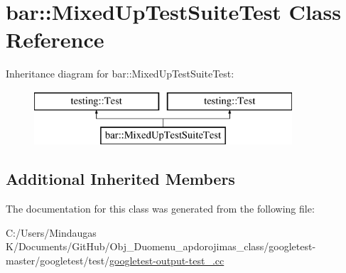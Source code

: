 \hypertarget{classbar_1_1_mixed_up_test_suite_test}{}\section{bar\+::Mixed\+Up\+Test\+Suite\+Test Class Reference}
\label{classbar_1_1_mixed_up_test_suite_test}
Inheritance diagram for bar\+::Mixed\+Up\+Test\+Suite\+Test\+:\begin{figure}[H]
\begin{center}
\leavevmode
\includegraphics[height=2.000000cm]{df/daf/classbar_1_1_mixed_up_test_suite_test}
\end{center}
\end{figure}
\subsection*{Additional Inherited Members}


The documentation for this class was generated from the following file\+:\begin{DoxyCompactItemize}
\item 
C\+:/\+Users/\+Mindaugas K/\+Documents/\+Git\+Hub/\+Obj\+\_\+\+Duomenu\+\_\+apdorojimas\+\_\+class/googletest-\/master/googletest/test/\mbox{\hyperlink{googletest-master_2googletest_2test_2googletest-output-test___8cc}{googletest-\/output-\/test\+\_\+.\+cc}}\end{DoxyCompactItemize}
